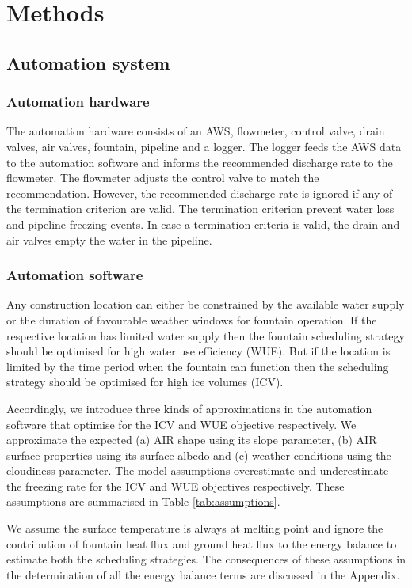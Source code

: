 \documentclass[tc, manuscript]{copernicus}
\begin{document}
\section{Methods}

\subsection{Automation system}

\subsubsection{Automation hardware}

The automation hardware consists of an AWS, flowmeter, control valve, drain valves, air valves, fountain,
pipeline and a logger. The logger feeds the AWS data to the automation software and informs the recommended
discharge rate to the flowmeter. The flowmeter adjusts the control valve to match the recommendation. However,
the recommended discharge rate is ignored if any of the termination criterion are valid. The termination
criterion prevent water loss and pipeline freezing events. In case a termination criteria is valid, the drain
and air valves empty the water in the pipeline.

\subsubsection{Automation software}

Any construction location can either be constrained by the available water supply or the duration of favourable
weather windows for fountain operation. If the respective location has limited water supply then the fountain
scheduling strategy should be optimised for high water use efficiency (WUE). But if the location is limited by
the time period when the fountain can function then the scheduling strategy should be optimised for high ice
volumes (ICV).

Accordingly, we introduce three kinds of approximations in the automation software that optimise for the ICV and
WUE objective respectively. We approximate the expected (a) AIR shape using its slope parameter, (b) AIR surface
properties using its surface albedo and (c) weather conditions using the cloudiness parameter. The model
assumptions overestimate and underestimate the freezing rate for the ICV and WUE objectives respectively. These
assumptions are summarised in Table \ref{tab:assumptions}. 

We assume the surface temperature is always at melting point and ignore the contribution of fountain heat
flux and ground heat flux to the energy balance to estimate both the scheduling strategies. The consequences of
these assumptions in the determination of all the energy balance terms are discussed in the Appendix.
\end{document}
